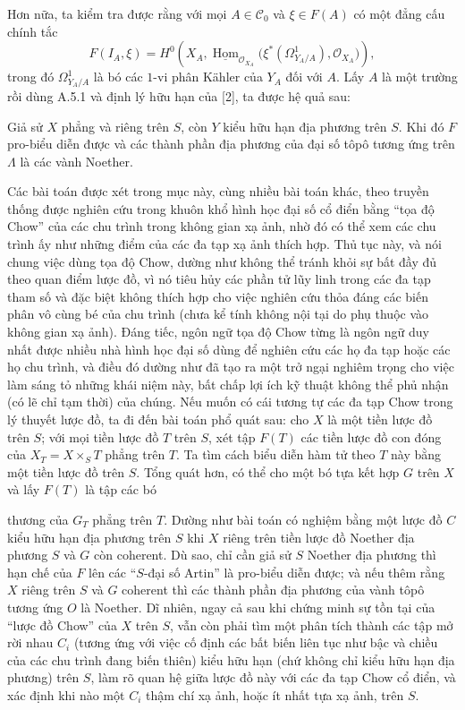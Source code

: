 Hơn nữa, ta kiểm tra được rằng với mọi $A\in\mathcal C_0$ và $\xi\in F(A)$ có
một đẳng cấu chính tắc
\[
  F(I_A,\xi)=H^0\!\left(
    X_A,
    \underline{\operatorname{Hom}}_{\mathcal O_{X_A}}
    \bigl(\xi^*(\Omega^1_{Y_A/A}),\mathcal O_{X_A}\bigr)
  \right),
\]
trong đó $\Omega^1_{Y_A/A}$ là bó các $1$-vi phân Kähler của $Y_A$ đối với
$A$. Lấy $A$ là một trường rồi dùng A.5.1 và định lý hữu hạn của [2], ta được
hệ quả sau:

 Giả sử $X$ phẳng và riêng trên $S$, còn $Y$ kiểu hữu hạn địa
phương trên $S$. Khi đó $F$ pro-biểu diễn được và các thành phần địa phương của
đại số tôpô tương ứng trên $\Lambda$ là các vành Noether.

 Các bài toán được xét trong mục này, cùng nhiều bài toán
khác, theo truyền thống được nghiên cứu trong khuôn khổ hình học đại số cổ điển
bằng ``tọa độ Chow'' của các chu trình trong không gian xạ ảnh, nhờ đó có thể
xem các chu trình ấy như những điểm của các đa tạp xạ ảnh thích hợp. Thủ tục
này, và nói chung việc dùng tọa độ Chow, dường như không thể tránh khỏi sự bất
đầy đủ theo quan điểm lược đồ, vì nó tiêu hủy các phần tử lũy linh trong các đa
tạp tham số và đặc biệt không thích hợp cho việc nghiên cứu thỏa đáng các biến
phân vô cùng bé của chu trình (chưa kể tính không nội tại do phụ thuộc vào
không gian xạ ảnh). Đáng tiếc, ngôn ngữ tọa độ Chow từng là ngôn ngữ duy nhất
được nhiều nhà hình học đại số dùng để nghiên cứu các họ đa tạp hoặc các họ
chu trình, và điều đó dường như đã tạo ra một trở ngại nghiêm trọng cho việc
làm sáng tỏ những khái niệm này, bất chấp lợi ích kỹ thuật không thể phủ nhận
(có lẽ chỉ tạm thời) của chúng. Nếu muốn có cái tương tự các đa tạp Chow trong
lý thuyết lược đồ, ta đi đến bài toán phổ quát sau: cho $X$ là một tiền lược đồ
trên $S$; với mọi tiền lược đồ $T$ trên $S$, xét tập $F(T)$ các tiền lược đồ
con đóng của $X_T=X\times_ST$ phẳng trên $T$. Ta tìm cách biểu diễn hàm tử theo
$T$ này bằng một tiền lược đồ trên $S$. Tổng quát hơn, có thể cho một bó tựa
kết hợp $G$ trên $X$ và lấy $F(T)$ là tập các bó

thương của $G_T$ phẳng trên $T$. Dường như bài toán có nghiệm bằng một lược đồ
$C$ kiểu hữu hạn địa phương trên $S$ khi $X$ riêng trên tiền lược đồ Noether
địa phương $S$ và $G$ còn coherent. Dù sao, chỉ cần giả sử $S$ Noether địa
phương thì hạn chế của $F$ lên các ``$S$-đại số Artin'' là pro-biểu diễn được;
và nếu thêm rằng $X$ riêng trên $S$ và $G$ coherent thì các thành phần địa
phương của vành tôpô tương ứng $O$ là Noether. Dĩ nhiên, ngay cả sau khi chứng
minh sự tồn tại của ``lược đồ Chow'' của $X$ trên $S$, vẫn còn phải tìm một
phân tích thành các tập mở rời nhau $C_i$ (tương ứng với việc cố định các bất
biến liên tục như bậc và chiều của các chu trình đang biến thiên) kiểu hữu hạn
(chứ không chỉ kiểu hữu hạn địa phương) trên $S$, làm rõ quan hệ giữa lược đồ
này với các đa tạp Chow cổ điển, và xác định khi nào một $C_i$ thậm chí xạ ảnh,
hoặc ít nhất tựa xạ ảnh, trên $S$.

